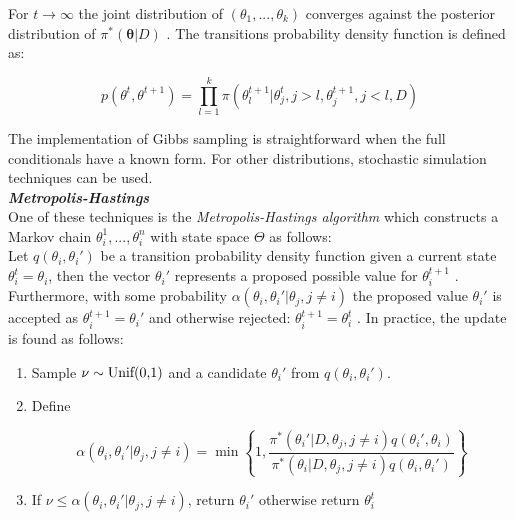 For $t\rightarrow{}\infty$ the joint distribution of $(\theta_1,...,\theta_k)$ converges against the posterior distribution of $\pi^*(\bm{\theta}|D)$ \citep{Roberts1994, Geman1984}. The transitions probability density function is defined as:

\begin{equation}
p(\theta^t,\theta^{t+1})=\prod_{l=1}^k{}\pi(\theta_l^{t+1}|\theta_j^t,j>l,\theta_j^{t+1},j<l,D)
\end{equation}

The implementation of Gibbs sampling is straightforward when the full conditionals have a known form. For other distributions, stochastic simulation techniques can be used.\\

\textbf{\textit{Metropolis-Hastings}}\\

One of these techniques is the \emph{Metropolis-Hastings algorithm} \citep{Metropolis1953, Hastings1970} which constructs a Markov chain $\theta_i^1,...,\theta_i^n$ with state space $\Theta$ as follows:\\

Let $q(\theta_i,\theta_i')$ be a transition probability density function given a current state $\theta_i^t=\theta_i$, then the vector $\theta_i'$ represents a proposed possible value for $\theta_i^{t+1}$ \citep{Bernardo2000}. Furthermore, with some probability $\alpha(\theta_i,\theta_i'|\theta_j,j\neq{}i)$ the proposed value $\theta_i'$ is accepted as $\theta_i^{t+1}=\theta_i'$ and otherwise rejected: $\theta_i^{t+1}=\theta_i^t$ \cite{Roberts1994, Hastings1970}. In practice, the update is found as follows:

\begin{enumerate}
\item Sample $\nu\sim\textnormal{Unif(0,1)}$ and a candidate $\theta_i'$ from $q(\theta_i,\theta_i')$.
\item Define

\begin{equation}
\alpha(\theta_i,\theta_i'|\theta_j,j\neq{}i)=\min\left\lbrace{}1,\frac{\pi^*(\theta_i'|D,\theta_j,j\neq{}i)q(\theta_i',\theta_i)}{\pi^*(\theta_i|D,\theta_j,j\neq{}i)q(\theta_i,\theta_i')}\right\rbrace
\end{equation}

\item If $\nu\leq{}\alpha(\theta_i,\theta_i'|\theta_j,j\neq{}i)$, return $\theta_i'$ otherwise return $\theta_i^t$
\end{enumerate}

